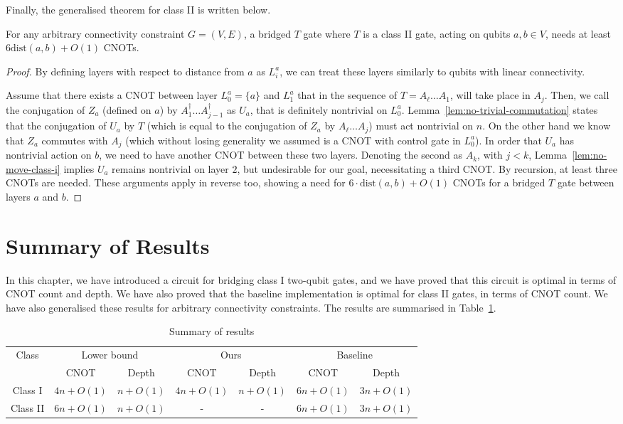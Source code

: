 Finally, the generalised theorem for class II is written below.

\begin{theorem}
    For any arbitrary connectivity constraint $G=(V,E)$, a bridged $T$ gate where $T$ is a class II gate, acting on qubits $a, b \in V$, needs at least $6 \mathrm{dist}(a,b) + O(1)$ CNOTs.
\end{theorem}
\begin{proof}
  By defining layers with respect to distance from $a$ as $L^{a}_i$, we can treat these layers similarly to qubits with linear connectivity.
  
  Assume that there exists a CNOT between layer $L^a_0 = \{ a \}$ and $L^a_1$ that in the sequence of $T = A_\ell \dots A_1$, will take place in $A_j$.
  Then, we call the conjugation of $Z_a$ (defined on $a$) by $A^\dagger_1 \dots A^\dagger_{j-1}$ as $U_a$, that is definitely nontrivial on $L^a_0$. Lemma~\ref{lem:no-trivial-commutation} states that the conjugation of $U_a$ by $T$ (which is equal to the conjugation of $Z_a$ by $A_\ell \dots A_j$) must act nontrivial on $n$. On the other hand we know that $Z_a$ commutes with $A_j$ (which without losing generality we assumed is a CNOT with control gate in $L^a_0$). In order that $U_a$ has nontrivial action on $b$, we need to have another CNOT between these two layers. Denoting the second as $A_k$, with $j < k$, Lemma~\ref{lem:no-move-class-i} implies $U_a$ remains nontrivial on layer $2$, but undesirable for our goal, necessitating a third CNOT.
  By recursion, at least three CNOTs are needed. These arguments apply in reverse too, showing a need for $6 \cdot \mathrm{dist}(a, b) + O(1)$ CNOTs for a bridged $T$ gate between layers $a$ and $b$.
\end{proof}
  

\section{Summary of Results}

In this chapter, we have introduced a circuit for bridging class I two-qubit gates, and we have proved that this circuit is optimal in terms of CNOT count and depth. We have also proved that the baseline implementation is optimal for class II gates, in terms of CNOT count. We have also generalised these results for arbitrary connectivity constraints. The results are summarised in Table~\ref{tab:summary}.

\begin{table}[h!]
  \centering
  \begin{tabular}{c||c|c||c|c||c|c}
    \multirow{2}{*}{Class} & \multicolumn{2}{c||}{Lower bound} & \multicolumn{2}{c||}{Ours} & \multicolumn{2}{c}{Baseline} \\
    \cline{2-7}
    & CNOT & Depth & CNOT & Depth & CNOT & Depth \\
    \hline\hline
    Class I & $4n + O(1)$ & $n + O(1)$ & $4n + O(1)$ & $n + O(1)$ & $6n + O(1)$ & $3n + O(1)$ \\
    Class II & $6n + O(1)$ & $n + O(1)$ & - & - & $6n + O(1)$ & $3n + O(1)$ \\
  \end{tabular}
  \caption{Summary of results}
  \label{tab:summary}
\end{table}